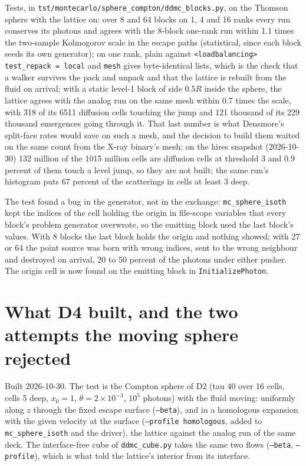 \documentclass[11pt]{article}
\begin{document}
Tests, in \texttt{tst/montecarlo/sphere\_compton/ddmc\_blocks.py}, on the Thomson
sphere with the lattice on: over 8 and 64 blocks on 1, 4 and 16 ranks every run
conserves its photons and agrees with the 8-block one-rank run within 1.1 times the
two-sample Kolmogorov scale in the escape paths (statistical, since each block seeds its
own generator); on one rank, plain against \texttt{<loadbalancing> test\_repack = local}
and \texttt{mesh} gives byte-identical lists, which is the check that a walker survives
the pack and unpack and that the lattice is rebuilt from the fluid on arrival; with a
static level-1 block of side $0.5R$ inside the sphere, the lattice agrees with the analog
run on the same mesh within 0.7 times the scale, with 318 of its 6511 diffusion cells
touching the jump and 121 thousand of its 229 thousand emergences going through it.
That last number is what Densmore's split-face rates would save on such a mesh, and the
decision to build them waited on the same count from the X-ray binary's mesh: on the
hires snapshot (2026-10-30) 132 million of the 1015 million cells are diffusion cells
at threshold 3 and 0.9 percent of them touch a level jump, so they are not built; the
same run's histogram puts 67 percent of the scatterings in cells at least 3 deep.

The test found a bug in the generator, not in the exchange: \texttt{mc\_sphere\_isoth}
kept the indices of the cell holding the origin in file-scope variables that every
block's problem generator overwrote, so the emitting block used the last block's values.
With 8 blocks the last block holds the origin and nothing showed; with 27 or 64 the
point source was born with wrong indices, sent to the wrong neighbour and destroyed on
arrival, 20 to 50 percent of the photons under either pusher.  The origin cell is now
found on the emitting block in \texttt{InitializePhoton}.

\section{What D4 built, and the two attempts the moving sphere rejected}
\label{sec:d4}

Built 2026-10-30.  The test is the Compton sphere of D2 (tau 40 over 16 cells, cells 5
deep, $x_0 = 1$, $\theta = 2\times10^{-3}$, $10^5$ photons) with the fluid moving:
uniformly along $z$ through the fixed escape surface (\texttt{--beta}), and in a
homologous expansion with the given velocity at the surface
(\texttt{--profile homologous}, added to \texttt{mc\_sphere\_isoth} and the driver), the
lattice against the analog run of the same deck.  The interface-free cube of
\texttt{ddmc\_cube.py} takes the same two flows (\texttt{--beta}, \texttt{--profile}),
which is what told the lattice's interior from its interface.
\end{document}
